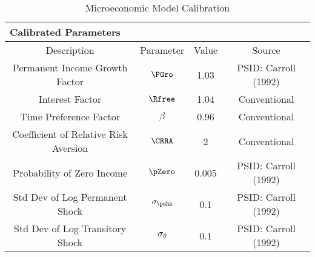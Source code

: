 \begin{table}
\begin{center}\renewcommand{\arraystretch}{1.5}
\caption{Microeconomic Model Calibration}\label{table:Calibration}
\begin{tabular}{|c|ccl|c|}
\hline
\multicolumn{5}{|l|}{Calibrated Parameters}  \\ \hline
Description                     & \multicolumn{1}{c}{Parameter} & Value & \multicolumn{2}{c|}{Source}\\ \hline
Permanent Income Growth Factor  & \multicolumn{1}{c}{$\PGro$} & 1.03 & \multicolumn{2}{c|}{PSID: Carroll (1992)} \\
Interest Factor                 & \multicolumn{1}{c}{$\Rfree$} & 1.04 & \multicolumn{2}{c|}{Conventional} \\
Time Preference Factor          & \multicolumn{1}{c}{$\beta$} & 0.96 & \multicolumn{2}{c|}{Conventional} \\
Coefficient of Relative Risk Aversion & \multicolumn{1}{c}{$\CRRA$} & 2 & \multicolumn{2}{c|}{Conventional} \\
Probability of Zero Income      & \multicolumn{1}{c}{$\pZero$} & 0.005 & \multicolumn{2}{c|}{PSID: Carroll (1992)} \\
Std Dev of Log Permanent Shock  & \multicolumn{1}{c}{$\sigma_{\pshk}$} & 0.1 & \multicolumn{2}{c|}{PSID: Carroll (1992)} \\
Std Dev of Log Transitory Shock & \multicolumn{1}{c}{$\sigma_{\theta}$} & 0.1 & \multicolumn{2}{c|}{PSID: Carroll (1992)} \\ \hline
\end{tabular}
\end{center}
\end{table}

